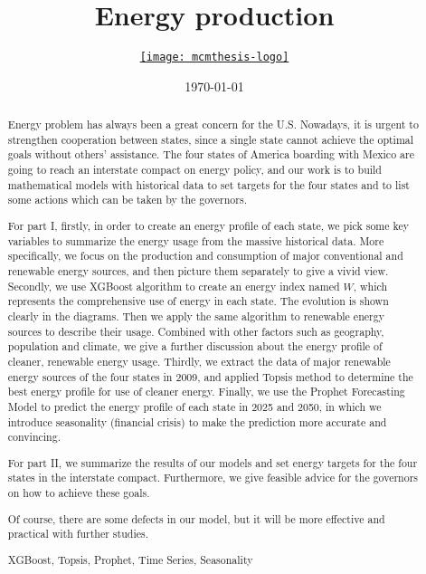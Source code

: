 \documentclass{mcmthesis}
\title{Energy production}
\author{\small \href{http://www.latexstudio.net/}
  {\texttt{[image: mcmthesis-logo]}}}
\date{\today}
\begin{document}
\begin{abstract}
Energy problem has always been a great concern for the U.S.
Nowadays, it is urgent to strengthen cooperation between states, since a single state cannot achieve the optimal goals without others' assistance.
The four states of America boarding with Mexico are going to reach an interstate compact on energy policy, and our work is to build mathematical models with historical data to set targets for the four states and to list some actions which can be taken by the governors.

For part I, firstly, in order to create an energy profile of each state, we pick some key variables to summarize the energy usage from the massive historical data.
More specifically, we focus on the production and consumption of major conventional and renewable energy sources, and then picture them separately to give a vivid view.
Secondly, we use XGBoost algorithm to create an energy index named $W$, which represents the comprehensive use of energy in each state.
The evolution is shown clearly in the diagrams.
Then we apply the same algorithm to renewable energy sources to describe their usage.
Combined with other factors such as geography, population and climate, we give a further discussion about the energy profile of cleaner, renewable energy usage.
Thirdly, we extract the data of major renewable energy sources of the four states in 2009, and applied Topsis method to determine the best energy profile for use of cleaner energy.
Finally, we use the Prophet Forecasting Model to predict the energy profile of each state in 2025 and 2050, in which we introduce seasonality (financial crisis) to make the prediction more accurate and convincing.

For part II, we summarize the results of our models and set energy targets for the four states in the interstate compact.
Furthermore, we give feasible advice for the governors on how to achieve these goals.

Of course, there are some defects in our model, but it will be more effective and practical with further studies.

\begin{keywords}
XGBoost, Topsis, Prophet, Time Series, Seasonality
\end{keywords}
\end{abstract}
\maketitle
\tableofcontents
\newpage
\end{document}
